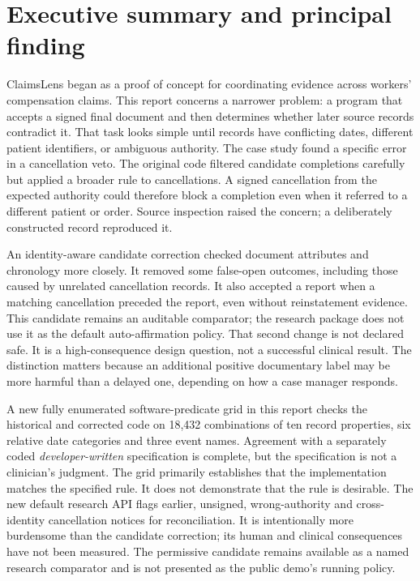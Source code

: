 \documentclass[11pt,twocolumn]{article}
\begin{document}
\section{Executive summary and principal finding}
ClaimsLens began as a proof of concept for coordinating evidence across workers' compensation claims. This report concerns a narrower problem: a program that accepts a signed final document and then determines whether later source records contradict it. That task looks simple until records have conflicting dates, different patient identifiers, or ambiguous authority. The case study found a specific error in a cancellation veto. The original code filtered candidate completions carefully but applied a broader rule to cancellations. A signed cancellation from the expected authority could therefore block a completion even when it referred to a different patient or order. Source inspection raised the concern; a deliberately constructed record reproduced it.

An identity-aware candidate correction checked document attributes and chronology more closely. It removed some false-open outcomes, including those caused by unrelated cancellation records. It also accepted a report when a matching cancellation preceded the report, even without reinstatement evidence. This candidate remains an auditable comparator; the research package does not use it as the default auto-affirmation policy. That second change is not declared safe. It is a high-consequence design question, not a successful clinical result. The distinction matters because an additional positive documentary label may be more harmful than a delayed one, depending on how a case manager responds.

A new fully enumerated software-predicate grid in this report checks the historical and corrected code on 18,432 combinations of ten record properties, six relative date categories and three event names. Agreement with a separately coded \emph{developer-written} specification is complete, but the specification is not a clinician's judgment. The grid primarily establishes that the implementation matches the specified rule. It does not demonstrate that the rule is desirable. The new default research API flags earlier, unsigned, wrong-authority and cross-identity cancellation notices for reconciliation. It is intentionally more burdensome than the candidate correction; its human and clinical consequences have not been measured. The permissive candidate remains available as a named research comparator and is not presented as the public demo's running policy.
\end{document}
